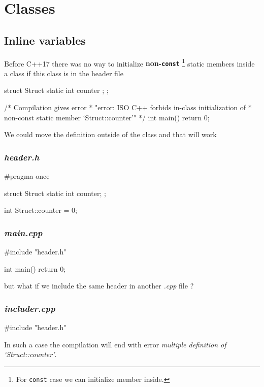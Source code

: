 \documentclass[../main]{subfiles}
\begin{document}
\section{Classes}
\subsection{Inline variables}
    Before C++17 there was no way to initialize \textbf{non-\texttt{const}}
    \footnote{For \texttt{const} case we can initialize member inside.}
static members inside a class if this class is in the header file

    \begin{Code}
        struct Struct
        {
            static int counter {};
        };

        /* Compilation gives error
         * "error: ISO C++ forbids in-class initialization of
         * non-const static member ‘Struct::counter’"
         */
        int main()
        {
            return 0;
        }
    \end{Code}

    We could move the definition outside of the class and that will
work
    \subsubsection{\textit{header.h}}
    \begin{Code}
        #pragma once
        
        struct Struct
        {
            static int counter;
        };

        int Struct::counter = 0;
    \end{Code}
    
    \subsubsection{\textit{main.cpp}}
    \begin{Code}
        #include "header.h"
        
        int main()
        {
            return 0;
        }
    \end{Code}
but what if we include the same header in another \textit{.cpp} file ?
    \subsubsection{\textit{includer.cpp}}
    \begin{Code}
        #include "header.h"
    \end{Code}
In such a case the compilation will end with error
\textit{multiple definition of `Struct::counter'}.\newline
\end{document}
